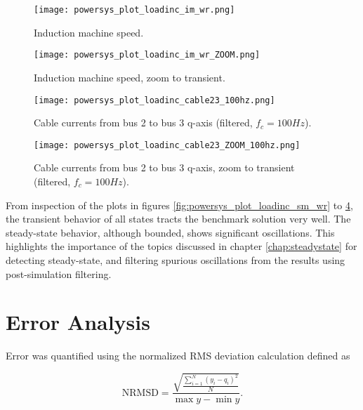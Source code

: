 \begin{figure}[h]
    \centering
    \texttt{[image: powersys\_plot\_loadinc\_im\_wr.png]}
    \caption{Induction machine speed.}
    \label{fig:powersys_plot_loadinc_im_wr}
\end{figure}

\begin{figure}[h]
    \centering
    \texttt{[image: powersys\_plot\_loadinc\_im\_wr\_ZOOM.png]}
    \caption{Induction machine speed, zoom to transient.}
    \label{fig:powersys_plot_loadinc_im_wr_ZOOM}
\end{figure}

\begin{figure}[h]
    \centering
    \texttt{[image: powersys\_plot\_loadinc\_cable23\_100hz.png]}
    \caption{Cable currents from bus 2 to bus 3 q-axis (filtered, $f_c=100 Hz$).}
    \label{fig:powersys_plot_loadinc_cable23_100hz}
\end{figure}

\begin{figure}[h]
    \centering
    \texttt{[image: powersys\_plot\_loadinc\_cable23\_ZOOM\_100hz.png]}
    \caption{Cable currents from bus 2 to bus 3 q-axis, zoom to transient (filtered, $f_c=100 Hz$).}
    \label{fig:powersys_plot_loadinc_cable23_ZOOM_100hz}
\end{figure}

From inspection of the plots in figures \ref{fig:powersys_plot_loadinc_sm_wr} to \ref{fig:powersys_plot_loadinc_cable23_ZOOM_100hz}, the transient behavior of all states tracts the benchmark solution very well. The steady-state behavior, although bounded, shows significant oscillations. This highlights the importance of the topics discussed in chapter \ref{chap:steadystate} for detecting steady-state, and filtering spurious oscillations from the results using post-simulation filtering.  
 
\section{Error Analysis}

Error was quantified using the normalized RMS deviation calculation defined as

\begin{equation}
    \text{NRMSD} = \frac{ \sqrt{ \frac{\sum_{i=1}^N{(y_i - q_i)^2}}{N} } }{\max{y} - \min{y}}.
\end{equation}

